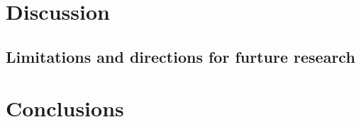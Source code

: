 \documentclass[preprint, 3p,
authoryear]{elsarticle} %
\begin{document}
\hypertarget{discussion}{%
\section{Discussion}\label{discussion}}

\hypertarget{limitations-and-directions-for-furture-research}{%
\subsection{Limitations and directions for furture
research}\label{limitations-and-directions-for-furture-research}}

\hypertarget{conclusions}{%
\section{Conclusions}\label{conclusions}}

\renewcommand\refname{References}

\end{document}
